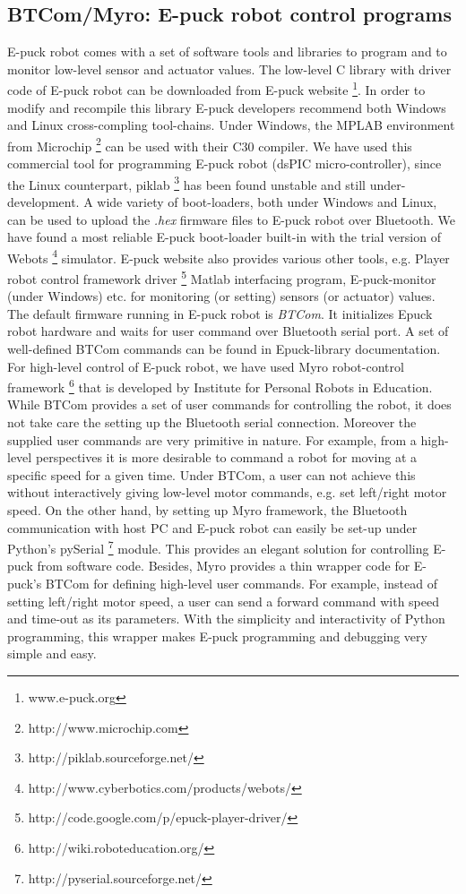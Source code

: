 \subsection{BTCom/Myro: E-puck robot control programs}
\label{expt-tools:btcom}
E-puck robot comes with a set of software tools and libraries to program and to monitor low-level sensor and actuator values. The low-level C library with driver code of E-puck robot can be downloaded from E-puck website \footnote{www.e-puck.org}. In order to modify and recompile this library E-puck developers recommend both Windows and Linux cross-compling tool-chains. Under Windows, the MPLAB environment from Microchip \footnote{http://www.microchip.com} can be used with their C30 compiler. We have used this commercial tool for programming E-puck robot (dsPIC micro-controller), since the Linux counterpart, piklab \footnote{http://piklab.sourceforge.net/} has been found unstable and still under-development. A wide variety of boot-loaders, both under Windows and Linux, can be used to upload the {\em .hex} firmware files to E-puck robot over Bluetooth. We have found a most reliable E-puck boot-loader built-in with the trial version of Webots \footnote{http://www.cyberbotics.com/products/webots/} simulator. E-puck website also provides various other tools, e.g. Player robot control framework driver \footnote{http://code.google.com/p/epuck-player-driver/} Matlab interfacing program, E-puck-monitor (under Windows) etc. for monitoring (or setting) sensors (or actuator) values. The default firmware running in E-puck robot is {\em BTCom}. It initializes Epuck robot hardware and waits for user command over Bluetooth serial port. A set of well-defined BTCom commands can be found in Epuck-library documentation. \\
For high-level control of E-puck robot, we have used Myro robot-control framework \footnote{http://wiki.roboteducation.org/} that is developed by Institute for Personal Robots in Education. While BTCom provides a set of user commands for controlling the robot, it does not take care the setting up the Bluetooth serial connection. Moreover the supplied user commands are very primitive in nature. For example, from a high-level perspectives it is more desirable to command a robot for moving at a specific speed for a given time. Under BTCom, a user can not achieve this without interactively giving low-level motor commands, e.g. set left/right motor speed. On the other hand, by setting up Myro framework, the Bluetooth communication with host PC and E-puck robot can easily be set-up under Python's pySerial \footnote{http://pyserial.sourceforge.net/} module. This provides an elegant solution for controlling E-puck from software code. Besides, Myro provides a thin wrapper code for E-puck's BTCom for defining high-level user commands. For example, instead of setting left/right motor speed, a user can send a forward command with speed and time-out as its parameters. With the simplicity and interactivity of Python programming, this wrapper makes E-puck programming and debugging very simple and easy.\\
